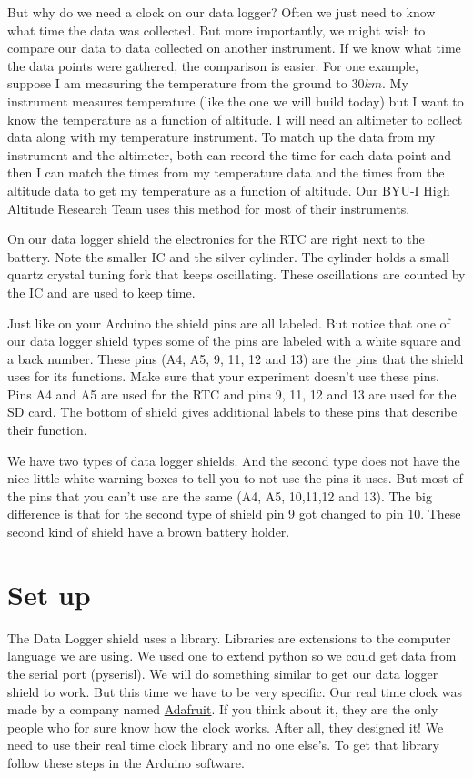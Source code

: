 	But why do we need a clock on our data logger?  Often we just need to know what time the data was collected.  But more importantly, we might wish to compare our data to data collected on another instrument. If we know what time the data points were gathered, the comparison is easier.  For one example, suppose I am measuring the temperature from the ground to $30km$. My instrument measures temperature (like the one we will build today) but I want to know the temperature as a function of altitude.  I will need an altimeter to collect data along with my temperature instrument.  To match up the data from my instrument and the altimeter, both can record the time for each data point and then I can match the times from my temperature data and the times from the altitude data to get my temperature as a function of altitude.  Our BYU-I High Altitude Research Team uses this method for most of their instruments.
	
	On our data logger shield the electronics for the RTC are right next to the battery. Note the smaller IC and the silver cylinder. The cylinder holds a small quartz crystal tuning fork that keeps oscillating. These oscillations are counted by the IC and are used to keep time. 
	
	
	Just like on your Arduino the shield pins are all labeled. But notice that one of our data logger shield types some of the pins are labeled with a white square and a back number. These pins (A4, A5, 9, 11, 12 and 13) are the pins that the shield uses for its functions. Make sure that your experiment doesn't use these pins. Pins A4 and A5 are used for the RTC and pins 9, 11, 12 and 13 are used for the SD card. The bottom of shield gives additional labels to these pins that describe their function.
	 
 	We have two types of data logger shields. And the second type does not have the nice little white warning boxes to tell you to not use the pins it uses.  But most of the pins that you can't use are the same (A4, A5, 10,11,12 and 13). The big difference is that for the second type of shield pin 9 got changed to pin 10.  These second kind of shield have a brown battery holder.  
 
 

\section{Set up}
	The Data Logger shield uses a library. Libraries are extensions to the computer language we are using. We used one to extend python so we could get data from the serial port (pyserisl).  We will do something similar to get our data logger shield to work. But this time we have to be very specific. Our real time clock was made by a company named \href{http://www.adafruit.com}{ Adafruit}. If you think about it, they are the only people who for sure know how the clock works.  After all, they designed it! We need to use their real time clock library and no one else's.  To get that library follow these steps in the Arduino software.
	
